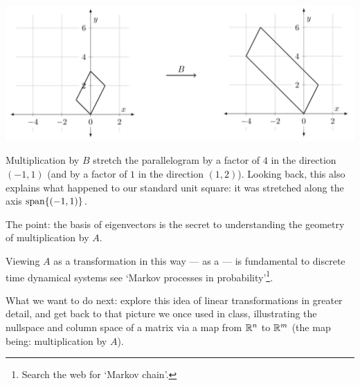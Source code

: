 \begin{myexample}
\begin{center}
\includegraphics[scale=.6]{img/TransformationB2.jpg}
\end{center}

Multiplication by $B$ stretch the parallelogram
by a factor of $4$ in the direction $(-1,1)$ (and by a factor of $1$ in the direction $(1,2)$).
Looking back, this also explains what happened to our standard unit square:  it
was stretched along the axis $\textrm{span}\{(-1,1)\}$.

The point:  the basis of eigenvectors is the secret to understanding
the geometry of multiplication by $A$.
\end{myexample}

Viewing $A$ as a transformation in this way --- as a  --- is fundamental to discrete time dynamical systems see  `Markov processes in probability'\footnote{Search the web for  `Markov chain'.}.


What we want to do next:  explore this idea of linear transformations in
greater detail, and get back to that picture we once used in class,
illustrating the nullspace and column space of a matrix via a map from
$\mathbb{R}^n$ to $\mathbb{R}^m$ (the map being:  multiplication by $A$).



